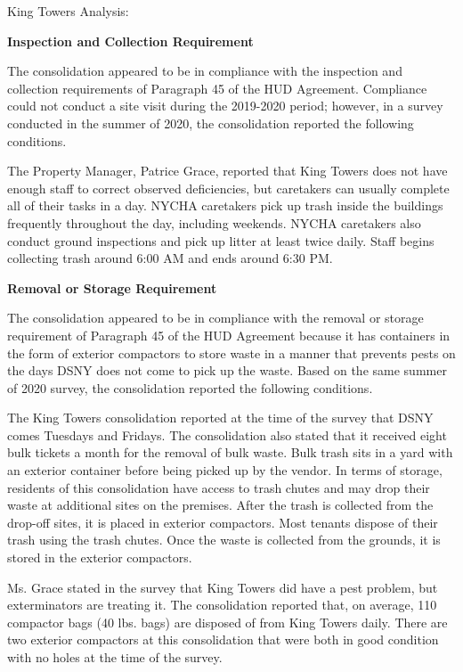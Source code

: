 King Towers Analysis: 

\textbf{Inspection and Collection Requirement} 

 

The consolidation appeared to be in compliance with the inspection and collection requirements of Paragraph 45 of the HUD Agreement. Compliance could not conduct a site visit during the 2019-2020 period; however, in a survey conducted in the summer of 2020, the consolidation reported the following conditions.

The Property Manager, Patrice Grace, reported that King Towers does not have enough staff to correct observed deficiencies, but caretakers can usually complete all of their tasks in a day. NYCHA caretakers pick up trash inside the buildings frequently throughout the day, including weekends. NYCHA caretakers also conduct ground inspections and pick up litter at least twice daily. Staff begins collecting trash around 6:00 AM and ends around 6:30 PM.

\textbf{Removal or Storage Requirement} 

The consolidation appeared to be in compliance with the removal or storage requirement of Paragraph  45 of the HUD Agreement because it has containers in the form of exterior compactors to store waste in a manner that prevents pests on the days DSNY does not come to pick up the waste. Based on the same summer of  2020 survey, the consolidation reported the following conditions.  

The King Towers consolidation reported at the time of the survey that DSNY comes Tuesdays and Fridays. The consolidation also stated that it received eight bulk tickets a month for the removal of bulk waste. Bulk trash sits in a yard with an exterior container before being picked up by the vendor. In terms of storage, residents of this consolidation have access to trash chutes and may drop their waste at additional sites on the premises. After the trash is collected from the drop-off sites, it is placed in exterior compactors. Most tenants dispose of their trash using the trash chutes. Once the waste is collected from the grounds, it is stored in the exterior compactors.  

 

Ms. Grace stated in the survey that King Towers did have a pest problem, but exterminators are treating it. The consolidation reported that, on average, 110 compactor bags (40 lbs. bags)  are disposed of from King Towers daily. There are two exterior compactors at this consolidation that were both in good condition with no holes at the time of the survey. 

